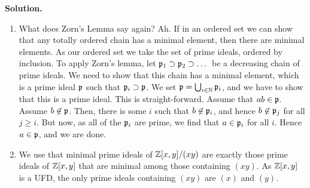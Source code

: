 \documentclass[a4paper,11pt]{article}
\begin{document}
\textbf{Solution.}
\begin{enumerate}
    \item What does Zorn's Lemma say again? Ah. If in an ordered set we can
        show that any totally ordered chain has a minimal element, then there
        are minimal elements. As our ordered set we take the set of prime ideals,
        ordered by inclusion. To apply Zorn's lemma, let $\mathfrak{p}_1 \supset \mathfrak{p}_2
        \supset \dots$ be a decreasing chain of prime ideals. We need to show
        that this chain has a minimal element, which is a prime ideal 
        $\mathfrak{p}$ such that $\mathfrak{p}_i \supset \mathfrak{p}$. We set $\mathfrak{p} = \bigcup_{i \in \mathbb{N}}
        \mathfrak{p}_i$, and we have to show that this is a prime ideal. This is
        straight-forward. Assume that $ab \in \mathfrak{p}$. Assume $b \not \in \mathfrak{p}$.
        Then, there is some $i$ such that $b \not \in \mathfrak{p}_i$, and hence $b \not
        \in \mathfrak{p}_j$ for all $j \geq i$. But now, as all of the $\mathfrak{p}_i$ are
        prime, we find that $a \in \mathfrak{p}_i$ for all $i$. Hence $a \in \mathfrak{p}$, and
        we are done. 
    \item We use that minimal prime ideals of $\mathbb{Z}[x,y]/(xy)$ are exactly those
        prime ideals of $\mathbb{Z}[x,y]$ that are minimal among those containing
        $(xy)$. As $\mathbb{Z}[x,y]$ is a UFD, the only prime ideals containing 
        $(xy)$ are $(x)$ and $(y)$.
\end{enumerate}

\contactend
\end{document}
